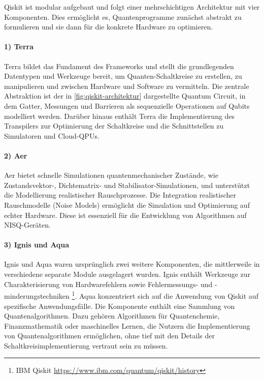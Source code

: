 Qiskit ist modular aufgebaut und folgt einer mehrschichtigen Architektur mit vier Komponenten. Dies ermöglicht es, Quantenprogramme zunächst abstrakt zu formulieren und sie dann für die konkrete Hardware zu optimieren. \autocite{javadi-abhariQuantumComputingQiskit2024a}
\\

\paragraph{1) Terra}
Terra bildet das Fundament des Frameworks und stellt die grundlegenden Datentypen und Werkzeuge bereit, um Quanten-Schaltkreise zu erstellen, zu manipulieren und zwischen Hardware und Software zu vermitteln. Die zentrale Abstraktion ist der in \autoref{fig:qiskit-architektur} dargestellte Quantum Circuit, in dem Gatter, Messungen und Barrieren als sequenzielle Operationen auf Qubits modelliert werden. Darüber hinaus enthält Terra die Implementierung des Transpilers zur Optimierung der Schaltkreise und die Schnittstellen zu Simulatoren und Cloud-QPUs. \autocite{javadi-abhariQuantumComputingQiskit2024a}
\\

\paragraph{2) Aer}
Aer bietet schnelle Simulationen quantenmechanischer Zustände, wie Zustands\-vektor\mbox{-}, Dichtematrix- und Stabilisator-Simulationen, und unterstützt die Modellierung realistischer Rauschprozesse. Die Integration realistischer Rauschmodelle (Noise Models) ermöglicht die Simulation und Optimierung auf echter Hardware. Diese ist essenziell für die Entwicklung von Algorithmen auf NISQ-Geräten. \autocite{javadi-abhariQuantumComputingQiskit2024a}
\\

\paragraph{3) Ignis und Aqua}
Ignis und Aqua waren ursprünglich zwei weitere Komponenten, die mittlerweile in verschiedene separate Module ausgelagert wurden. Ignis enthält Werkzeuge zur Charakterisierung von Hardwarefehlern sowie Fehlermessungs- und -minderungstechniken \footnote{IBM Qiskit \url{https://www.ibm.com/quantum/qiskit/history}}. Aqua konzentriert sich auf die Anwendung von Qiskit auf spezifische Anwendungsfälle. Die Komponente enthält eine Sammlung von Quantenalgorithmen. Dazu gehören Algorithmen für Quantenchemie, Finanzmathematik oder maschinelles Lernen, die Nutzern die Implementierung von Quantenalgorithmen ermöglichen, ohne tief mit den Details der Schaltkreisimplementierung vertraut sein zu müssen. \autocite{javadi-abhariQuantumComputingQiskit2024a}

